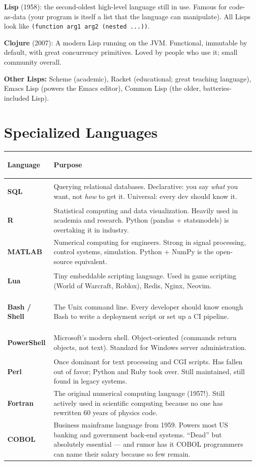 \documentclass[11pt, letterpaper]{article}
\begin{document}
\textbf{Lisp} (1958): the second-oldest high-level language still in use. Famous for code-as-data (your program is itself a list that the language can manipulate). All Lisps look like \texttt{(function arg1 arg2 (nested ...))}.

\textbf{Clojure} (2007): A modern Lisp running on the JVM. Functional, immutable by default, with great concurrency primitives. Loved by people who use it; small community overall.

\textbf{Other Lisps:} Scheme (academic), Racket (educational; great teaching language), Emacs Lisp (powers the Emacs editor), Common Lisp (the older, batteries-included Lisp).

\section*{Specialized Languages}

\noindent
{\renewcommand{\arraystretch}{1.6}
\begin{tabularx}{\textwidth}{>{\bfseries\raggedright\arraybackslash}p{2.5cm}
                              >{\raggedright\arraybackslash}X}
\toprule
\rowcolor{tableheaderteal}
\textbf{Language} & \textbf{Purpose} \\
\midrule
\rowcolor{rowTe} \textbf{SQL}    & Querying relational databases. Declarative: you say \emph{what} you want, not \emph{how} to get it. Universal: every dev should know it. \\
\rowcolor{rowA}  \textbf{R}      & Statistical computing and data visualization. Heavily used in academia and research. Python (pandas + statsmodels) is overtaking it in industry. \\
\rowcolor{rowTe} \textbf{MATLAB} & Numerical computing for engineers. Strong in signal processing, control systems, simulation. Python + NumPy is the open-source equivalent. \\
\rowcolor{rowA}  \textbf{Lua}    & Tiny embeddable scripting language. Used in game scripting (World of Warcraft, Roblox), Redis, Nginx, Neovim. \\
\rowcolor{rowTe} \textbf{Bash / Shell} & The Unix command line. Every developer should know enough Bash to write a deployment script or set up a CI pipeline. \\
\rowcolor{rowA}  \textbf{PowerShell} & Microsoft's modern shell. Object-oriented (commands return objects, not text). Standard for Windows server administration. \\
\rowcolor{rowTe} \textbf{Perl}   & Once dominant for text processing and CGI scripts. Has fallen out of favor; Python and Ruby took over. Still maintained, still found in legacy systems. \\
\rowcolor{rowA}  \textbf{Fortran} & The original numerical computing language (1957!). Still actively used in scientific computing because no one has rewritten 60 years of physics code. \\
\rowcolor{rowTe} \textbf{COBOL}  & Business mainframe language from 1959. Powers most US banking and government back-end systems. ``Dead'' but absolutely essential --- and rumor has it COBOL programmers can name their salary because so few remain. \\
\bottomrule
\end{tabularx}}
\end{document}
